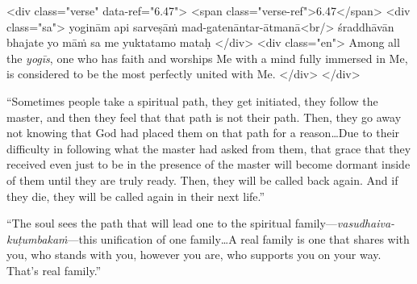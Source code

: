 \begin{html}
<div class="verse" data-ref="6.47">
  <span class="verse-ref">6.47</span>
  <div class="sa">
    yoginām api sarveṣāṁ mad-gatenāntar-ātmanā<br/>
    śraddhāvān bhajate yo māṁ sa me yuktatamo mataḥ
  </div>
  <div class="en">
    Among all the \textit{yogīs}, one who has faith and worships Me with a mind fully immersed in Me, is considered to be the most perfectly united with Me.
  </div>
</div>
\end{html}


\enquote{Sometimes people take a spiritual path, they get initiated, they follow the master, and then they feel that that path is not their path. Then, they go away not knowing that God had placed them on that path for a reason\ldots Due to their difficulty in following what the master had asked from them, that grace that they received even just to be in the presence of the master will become dormant inside of them until they are truly ready. Then, they will be called back again. And if they die, they will be called again in their next life.}

\enquote{The soul sees the path that will lead one to the spiritual family---\textit{vasudhaiva-kuṭumbakaṁ}---this unification of one family\ldots A real family is one that shares with you, who stands with you, however you are, who supports you on your way. That’s real family.}

